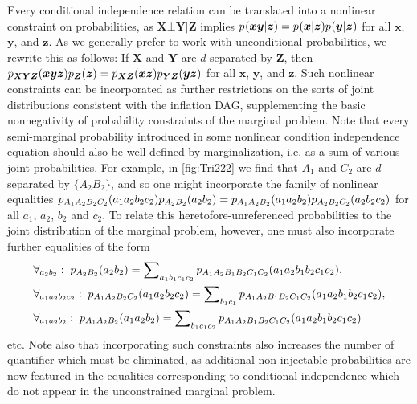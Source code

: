 Every conditional independence relation can be translated into a nonlinear constraint on probabilities, as $\bm{X}\bot\bm{Y}|\bm{Z}$ implies $\p{\bm{x}\bm{y}|\bm{z}}=\p{\bm{x}|\bm{z}}\p{\bm{y}|\bm{z}}$ for all $\bm{x}$, $\bm{y}$, and $\bm{z}$. As we generally prefer to work with unconditional probabilities, we rewrite this as follows: If $\bm{X}$ and $\bm{Y}$ are $d$-separated by $\bm{Z}$, then $\p[\bm{X}\bm{Y}\bm{Z}]{\bm{x}\bm{y}\bm{z}}\p[\bm{Z}]{\bm{z}}=\p[\bm{X}\bm{Z}]{\bm{x}\bm{z}}\p[\bm{Y}\bm{Z}]{\bm{y}\bm{z}}$ for all $\bm{x}$, $\bm{y}$, and $\bm{z}$. Such nonlinear constraints can be incorporated as further restrictions on the sorts of joint distributions consistent with the inflation DAG, supplementing the basic nonnegativity of probability constraints of the marginal problem. Note that every semi-marginal probability introduced in some nonlinear condition independence equation should also be well defined by marginalization, i.e. as a sum of various joint probabilities.
For example, in \cref{fig:Tri222} we find that $A_1$ and $C_2$ are $d$-separated by $\{A_2 B_2\}$, and so one might incorporate the family of nonlinear equalities $\p[A_1 A_2 B_2 C_2]{a_1 a_2 b_2 c_2}\p[A_2 B_2]{a_2 b_2}=\p[A_1 A_2 B_2]{a_1 a_2 b_2}\p[A_2 B_2 C_2]{a_2 b_2 c_2}$ for all $a_1$, $a_2$, $b_2$ and $c_2$. To relate this heretofore-unreferenced probabilities to the joint distribution of the marginal problem, however, one must also incorporate further equalities of the form
\begin{align}
\begin{split}
&\forall_{a_2 b_2}:\;\p[A_2 B_2]{a_2 b_2} = \sum\nolimits_{a_1 b_1 c_1 c_2}\p[A_1 A_2 B_1 B_2 C_1 C_2]{a_1 a_2 b_1 b_2 c_1 c_2},\\
&\forall_{a_1 a_2 b_2 c_2}:\;\p[A_1 A_2 B_2 C_2]{a_1 a_2 b_2 c_2} = \sum\nolimits_{b_1 c_1}\p[A_1 A_2 B_1 B_2 C_1 C_2]{a_1 a_2 b_1 b_2 c_1 c_2},\\
&\forall_{a_1 a_2 b_2}:\;\p[A_1 A_2 B_2]{a_1 a_2 b_2} = \sum\nolimits_{b_1 c_1 c_2}\p[A_1 A_2 B_1 B_2 C_1 C_2]{a_1 a_2 b_1 b_2 c_1 c_2}
\end{split}
\end{align}
etc. Note also that incorporating such constraints also increases the number of quantifier which must be eliminated, as additional non-injectable probabilities are now featured in the equalities corresponding to conditional independence which do not appear in the unconstrained marginal problem. 

